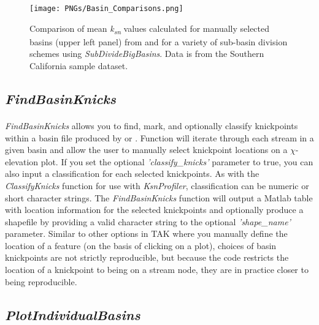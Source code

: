 \begin{figure}[H]
	\texttt{[image: PNGs/Basin\_Comparisons.png]}
	\caption{Comparison of mean \textit{k\textsubscript{sn}} values calculated for manually selected basins (upper left panel) from  and for a variety of sub-basin division schemes using \textit{SubDivideBigBasins}. Data is from the Southern California sample dataset.}
	\label{fig:BasinsComp}
\end{figure}

\subsection{\textit{FindBasinKnicks}} \label{sec:BsnKncks}
\paragraph{}\textit{FindBasinKnicks} allows you to find, mark, and optionally classify knickpoints within a basin file produced by  or . Function will iterate through each stream in a given basin and allow the user to manually select knickpoint locations on a $\chi$-elevation plot. If you set the optional \textit{'classify\_knicks'} parameter to true, you can also input a classification for each selected knickpoints. As with the \textit{ClassifyKnicks} function for use with \textit{KsnProfiler}, classification can be numeric or short character strings. The \textit{FindBasinKnicks} function will output a Matlab table with location information for the selected knickpoints and optionally produce a shapefile by providing a valid character string to the optional \textit{'shape\_name'} parameter. Similar to other options in TAK where you manually define the location of a feature (on the basis of clicking on a plot), choices of basin knickpoints are not strictly reproducible, but because the code restricts the location of a knickpoint to being on a stream node, they are in practice closer to being reproducible.

\subsection{\textit{PlotIndividualBasins}}
